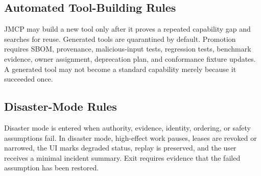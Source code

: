 \documentclass[10pt,journal,onecolumn]{IEEEtran}
\begin{document}
\subsection{Automated Tool-Building Rules}
JMCP may build a new tool only after it proves a repeated capability gap and searches for reuse. Generated tools are quarantined by default. Promotion requires SBOM, provenance, malicious-input tests, regression tests, benchmark evidence, owner assignment, deprecation plan, and conformance fixture updates. A generated tool may not become a standard capability merely because it succeeded once.

\subsection{Disaster-Mode Rules}
Disaster mode is entered when authority, evidence, identity, ordering, or safety assumptions fail. In disaster mode, high-effect work pauses, leases are revoked or narrowed, the UI marks degraded status, replay is preserved, and the user receives a minimal incident summary. Exit requires evidence that the failed assumption has been restored.
\end{document}
